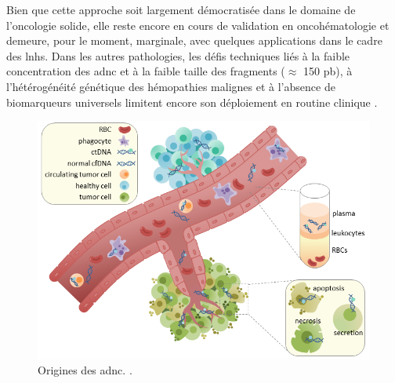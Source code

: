 Bien que cette approche soit largement démocratisée dans le domaine de
l'oncologie solide, elle reste encore en cours de validation en oncohématologie
et demeure, pour le moment, marginale, avec quelques applications dans le cadre
des \glspl{lnh}. Dans les autres pathologies, les défis techniques liés à la
faible concentration des \gls{adnc} et à la faible taille des fragments
($\approx$ 150 pb), à l'hétérogénéité génétique des hémopathies malignes et à
l'absence de biomarqueurs universels limitent encore son déploiement en routine
clinique \cite{daoUsingCfDNACtDNA2023}.

\begin{figure}[H]
    \includegraphics[width=1\textwidth]{images/ctdna.png}
    \caption{Origines des \gls{adnc}. \citeauthor{racheljunewongEnglishCirculatingTumor2017} \cite{racheljunewongEnglishCirculatingTumor2017}.}
    \label{fig:ctdna}
\end{figure}

